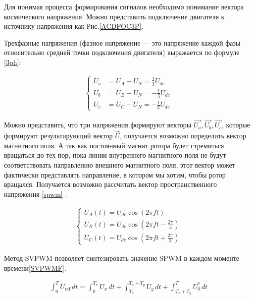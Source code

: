 Для понимая процесса формирования сигналов необходимо понимание вектора космического напряжения. Можно представить подключение двигателя к источнику напряжения как Рис.\ref{ACDFOC3P}.

Трехфазные напряжения (фазное напряжение — это напряжение каждой фазы относительно средней точки подключения двигателя)  выражается по формуле \ref{3ph}:
\begin{ceqn}
	\begin{align} \label{3ph}
		\begin{cases}
			U_a & = U_A - U_N = \frac{2}{3} U_{dc}  \\
			U_b & = U_B - U_N = -\frac{1}{3} U_{dc} \\
			U_c & = U_C - U_N = -\frac{1}{3} U_{dc}
		\end{cases}
	\end{align}
\end{ceqn}
Можно представить, что три напряжения формируют векторы $\vec{U_a}, \vec{U_b}, \vec{U_c}$, которые формируют результирующий вектор $\vec{U}$, получается возможно определить вектор магнитного поля. А так как постоянный магнит ротора будет стремиться вращаться до тех пор, пока линии внутреннего магнитного поля не будут соответствовать направлению внешнего магнитного поля, этот вектор может фактически представлять направление, в котором мы хотим, чтобы ротор вращался. Получается возможно рассчитать вектор пространственного напряжения \ref{spwm} \citep{youtuFieldOriented}.


\begin{ceqn}
	\begin{align} \label{spwm}
		\begin{cases}
			U_A(t) = U_{dc}\cos(2\pi ft)                             \\
			U_B(t) = U_{dc}\cos\left(2\pi ft - \frac{2\pi}{3}\right) \\
			U_C(t) = U_{dc}\cos\left(2\pi ft + \frac{2\pi}{3}\right)
		\end{cases}
	\end{align}
\end{ceqn}


Метод SVPWM позволяет синтезировать значение SPWM в каждом моменте времени\ref{SVPWMF}.
\begin{ceqn}
	\begin{align} \label{SVPWMF}
		\int_0^T U_{\text{ref}} \, dt = \int_0^{T_x} U_x \, dt + \int_{T_x}^{T_x+T_y} U_y \, dt + \int_{T_x+T_y}^T U^*_0 \, dt
	\end{align}
\end{ceqn}

